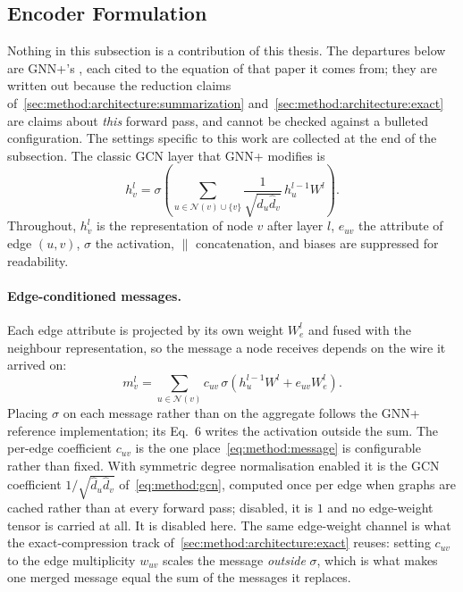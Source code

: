 \subsection{Encoder Formulation}
\label{sec:method:architecture:equations}
Nothing in this subsection is a contribution of this thesis. The departures below are
GNN+'s \citep{luo2024gnnplus}, each cited to the equation of that paper it comes from;
they are written out because the reduction claims
of~\ref{sec:method:architecture:summarization} and~\ref{sec:method:architecture:exact} are
claims about \emph{this} forward pass, and cannot be checked against a bulleted
configuration. The settings specific to this work are collected at the end of the
subsection. The classic GCN layer \citep{kipf2017gcn} that GNN+ modifies is
\begin{equation}
    h_v^{l} = \sigma\!\left( \sum_{u \in \mathcal{N}(v) \cup \{v\}}
    \frac{1}{\sqrt{\hat{d}_u \hat{d}_v}}\, h_u^{l-1} W^{l} \right).
    \label{eq:method:gcn}
\end{equation}
Throughout, $h_v^{l}$ is the representation of node $v$ after layer $l$, $e_{uv}$ the
attribute of edge $(u,v)$, $\sigma$ the activation, $\|$ concatenation, and biases are
suppressed for readability.

\paragraph{Edge-conditioned messages.}
Each edge attribute is projected by its own weight $W_e^{l}$ and fused with the neighbour
representation, so the message a node receives depends on the wire it arrived on:
\begin{equation}
    m_v^{l} = \sum_{u \in \mathcal{N}(v)}
    c_{uv} \, \sigma\!\left( h_u^{l-1} W^{l} + e_{uv} W_e^{l} \right).
    \label{eq:method:message}
\end{equation}
Placing $\sigma$ on each message rather than on the aggregate follows the GNN+ reference
implementation; its Eq.~6 writes the activation outside the sum. The per-edge coefficient $c_{uv}$ is the one place~\eqref{eq:method:message} is
configurable rather than fixed. With symmetric degree normalisation enabled it is the
GCN coefficient $1 / \sqrt{\hat{d}_u \hat{d}_v}$ of~\eqref{eq:method:gcn}, computed once
per edge when graphs are cached rather than at every forward pass; disabled, it is $1$
and no edge-weight tensor is carried at all. It is disabled here. The same
edge-weight channel is what the exact-compression track
of~\ref{sec:method:architecture:exact} reuses: setting $c_{uv}$ to the edge multiplicity
$w_{uv}$ scales the message \emph{outside} $\sigma$, which is what makes one merged
message equal the sum of the messages it replaces.

